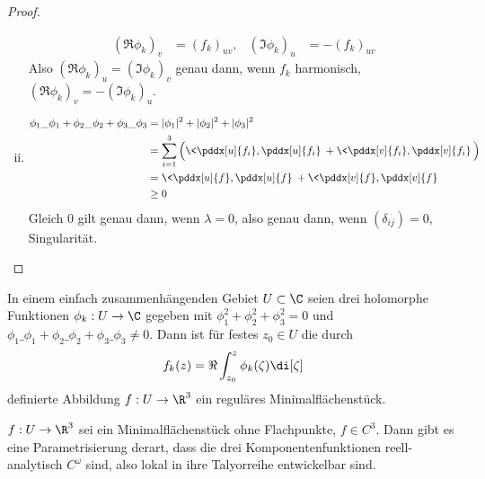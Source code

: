 \begin{st}
\begin{proof}
\begin{enumerate}[(i)]
\begin{align*}
					(\Re \phi_k)_v &= (f_k)_{uv}, & (\Im \phi_k)_u &= - (f_k)_{uv}
				\end{align*}
				Also $(\Re \phi_k)_u = (\Im \phi_k)_v$ genau dann, wenn $f_k$ harmonisch, $(\Re \phi_k)_v = -(\Im \phi_k)_u$.
			\item
				\begin{align*}
					\phi_1 \_\phi_1 + \phi_2 \_\phi_2 + \phi_3 \_\phi_3
					&= |\phi_1|^2 + |\phi_2|^2 + |\phi_3|^2 \\
					&= \sum_{i=1}^3 \Big( \<\pddx[u]{f_i}, \pddx[u]{f_i} \> + \<\pddx[v]{f_i}, \pddx[v]{f_i} \> \Big) \\
					&= \< \pddx[u]{f}, \pddx[u]{f} \> + \< \pddx[v]{f}, \pddx[v]{f} \> \\
					&\ge 0
				\end{align*}
				Gleich 0 gilt genau dann, wenn $\lambda = 0$, also genau dann, wenn $(\delta_{ij}) = 0$, Singularität.
		\end{enumerate}
	\end{proof}
\end{st}

\begin{kor}
	In einem einfach zusammenhängenden Gebiet $U \subset \C$ seien drei holomorphe Funktionen $\phi_k: U \to \C$ gegeben mit $\phi_1^2 + \phi_2^2 + \phi_3^2 = 0$ und $\phi_1\_\phi_1 + \phi_2 \_\phi_2 + \phi_3 \_\phi_3 \neq 0$.
	Dann ist für festes $z_0 \in U$ die durch
	\[
		f_k(z) = \Re \int_{z_0}^z \phi_k(\zeta) \di[\zeta]
	\]
	definierte Abbildung $f: U \to \R^3$ ein reguläres Minimalflächenstück.
\end{kor}

\begin{kor}
	$f: U \to \R^3$ sei ein Minimalflächenstück ohne Flachpunkte, $f \in C^3$.
	Dann gibt es eine Parametrisierung derart, dass die drei Komponentenfunktionen reell-analytisch $C^\omega$ sind, also lokal in ihre Talyorreihe entwickelbar sind.
\end{kor}

